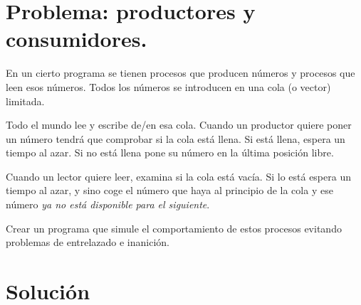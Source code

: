 \documentclass[a4paper,12pt,spanish]{sphinxmanual}
\begin{document}
\section{Problema: productores y consumidores.}
\label{textos/tema2:problema-productores-y-consumidores}
En un cierto programa se tienen procesos que producen números y procesos que leen esos números. Todos los números se introducen en una cola (o vector) limitada.

Todo el mundo lee y escribe de/en esa cola. Cuando un productor quiere poner un número tendrá que comprobar si la cola está llena. Si está llena, espera un tiempo al azar. Si no está llena pone su número en la última posición libre.

Cuando un lector quiere leer, examina si la cola está vacía. Si lo está espera un tiempo al azar, y sino coge el número que haya al principio de la cola y ese número \emph{ya no está disponible para el siguiente}.

Crear un programa que simule el comportamiento de estos procesos evitando problemas de entrelazado e inanición.


\section{Solución}
\label{textos/tema2:solucion}
\end{document}
